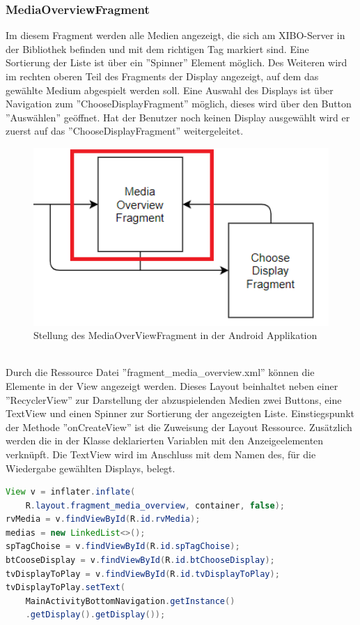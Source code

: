 \subsubsection{MediaOverviewFragment}
Im diesem Fragment werden alle Medien angezeigt, die sich am XIBO-Server in der Bibliothek befinden und mit dem richtigen Tag markiert sind. Eine Sortierung der Liste ist über ein ''Spinner'' Element möglich. Des Weiteren wird im rechten oberen Teil des Fragments der Display angezeigt, auf dem das gewählte Medium abgespielt werden soll. Eine Auswahl des Displays ist über Navigation zum ''ChooseDisplayFragment'' möglich, dieses wird über den Button ''Auswählen'' geöffnet. Hat der Benutzer noch keinen Display ausgewählt wird er zuerst auf das ''ChooseDisplayFragment'' weitergeleitet.
\\
\begin{figure}[H]
\centering
\includegraphics[width=1.0\textwidth]{images/06_AndroidApp/06_MediaOverViewStellung}
\caption{Stellung des MediaOverViewFragment in der Android Applikation}
\label{fig:mediaNav}
\end{figure}
\\
Durch die Ressource Datei ''fragment\_media\_overview.xml'' können die Elemente in der View angezeigt werden. Dieses Layout beinhaltet neben einer ''RecyclerView'' zur Darstellung der abzuspielenden Medien zwei Buttons, eine TextView und einen Spinner zur Sortierung der angezeigten Liste. Einstiegspunkt der Methode ''onCreateView'' ist die Zuweisung der Layout Ressource. Zusätzlich werden die in der Klasse deklarierten Variablen mit den Anzeigeelementen verknüpft. Die TextView wird im Anschluss mit dem Namen des, für die Wiedergabe gewählten Displays, belegt.
\begin{lstlisting}[language=Java,caption={Instantiieren der benötigten Variablen im MediaOverviewFragment}]
View v = inflater.inflate(
	R.layout.fragment_media_overview, container, false);
rvMedia = v.findViewById(R.id.rvMedia);
medias = new LinkedList<>();
spTagChoise = v.findViewById(R.id.spTagChoise);
btCooseDisplay = v.findViewById(R.id.btChooseDisplay);
tvDisplayToPlay = v.findViewById(R.id.tvDisplayToPlay);
tvDisplayToPlay.setText(
	MainActivityBottomNavigation.getInstance()
	.getDisplay().getDisplay()); 
\end{lstlisting}
